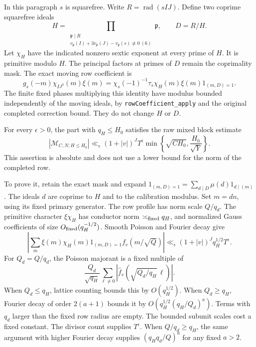 \documentclass[11pt]{article}
\begin{document}
In this paragraph $s$ is squarefree. Write $R=\operatorname{rad}(sIJ)$.
Define two coprime squarefree ideals
\[
 H=\prod_{\substack{\mathfrak p\mid R\\
       v_{\mathfrak p}(I)+3v_{\mathfrak p}(J)
              -v_{\mathfrak p}(s)\not\equiv0\ (6)}}\mathfrak p,
 \qquad D=R/H.
\]
Let $\chi_H$ have the indicated nonzero sextic exponent at every prime
of $H$. It is primitive modulo $H$. The principal factors at primes of
$D$ remain the coprimality mask. The exact moving row coefficient is
\[
 g_s(-m)\chi_{IJ^3}(m)\xi(m)
    =\chi_s(-1)^{-1}\tau_s\chi_H(m)\xi(m)1_{(m,D)=1}.
\]
The finite fixed phases multiplying this identity have modulus bounded
independently of the moving ideals, by
\texttt{rowCoefficient\_apply} and the original completed correction
bound. They do not change $H$ or $D$.

For every $\epsilon>0$, the part with $q_H\le H_0$ satisfies the raw
mixed block estimate
\[
 |\mathcal M_{C,N;H\le H_0}|
   \ll_\epsilon (1+|v|)^J T^\epsilon
     \min\left\{\sqrt{CH_0},\frac{H_0}{\sqrt Y}\right\}.
\]
This assertion is absolute and does not use a lower bound for the norm
of the completed row.

To prove it, retain the exact mask and expand
$1_{(m,D)=1}=\sum_{d\mid D}\mu(d)1_{d\mid(m)}$.
The ideals $d$ are coprime to $H$ and to the calibration modulus.
Set $m=d n$, using its fixed primary generator. The row profile has norm
scale $Q/q_d$. The primitive character $\xi\chi_H$ has conductor norm
$\asymp_{\rm fixed}q_H$, and normalized Gauss coefficients of size
$O_{\rm fixed}(q_H^{-1/2})$. Smooth Poisson and Fourier decay give
\[
 \left|\sum_m\xi(m)\chi_H(m)1_{(m,D)=1}
                     f_v(m/\sqrt Q)\right|
 \ll_\epsilon (1+|v|)^J q_H^{1/2}T^\epsilon.
\]
For $Q_d=Q/q_d$, the Poisson majorant is a fixed multiple of
\[
 \frac{Q_d}{\sqrt{q_H}}\sum_{\ell\ne0}
       |\widehat f_v(\sqrt{Q_d/q_H}\,\ell)|.
\]
When $Q_d\le q_H$, lattice counting bounds this by $O(q_H^{1/2})$.
When $Q_d\ge q_H$, Fourier decay of order $2(a+1)$ bounds it by
$O(q_H^{1/2}(q_H/Q_d)^a)$.
Terms with $q_d$ larger than the fixed row radius are empty. The bounded
subunit scales cost a fixed constant. The divisor count supplies
$T^\epsilon$. When $Q/q_d\ge q_H$, the same argument with higher
Fourier decay supplies $(q_Hq_d/Q)^a$ for any fixed $a>2$.
\end{document}
